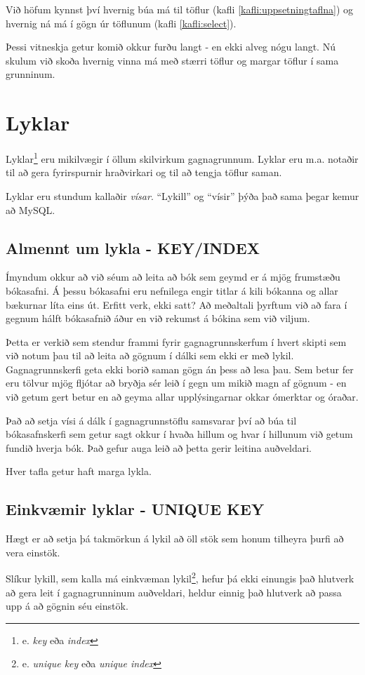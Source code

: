 Við höfum kynnst því hvernig búa má til töflur (kafli \ref{kafli:uppsetningtaflna}) og hvernig ná má í gögn úr töflunum (kafli \ref{kafli:select}). 

Þessi vitneskja getur komið okkur furðu langt - en ekki alveg nógu langt. Nú skulum við skoða hvernig vinna má með stærri töflur og margar töflur í sama grunninum.
\section{Lyklar}
\label{undirkafli:lyklar}
Lyklar\footnote{e. \emph{key} eða \emph{index}} eru mikilvægir í öllum skilvirkum gagnagrunnum. Lyklar eru m.a. notaðir til að gera fyrirspurnir hraðvirkari og til að tengja töflur saman.

Lyklar eru stundum kallaðir \emph{vísar}. ``Lykill'' og ``vísir'' þýða það sama þegar kemur að MySQL.
\subsection{Almennt um lykla - KEY/INDEX}
Ímyndum okkur að við séum að leita að bók sem geymd er á mjög frumstæðu bókasafni. Á þessu bókasafni eru nefnilega engir titlar á kili bókanna og allar bækurnar líta eins út.
Erfitt verk, ekki satt? Að meðaltali þyrftum við að fara í gegnum hálft bókasafnið áður en við rekumst á bókina sem við viljum.

Þetta er verkið sem stendur frammi fyrir gagnagrunnskerfum í hvert skipti sem við notum þau til að leita að gögnum í dálki sem ekki er með lykil.
Gagnagrunnskerfi geta ekki borið saman gögn án þess að lesa þau.
Sem betur fer eru tölvur mjög fljótar að bryðja sér leið í gegn um mikið magn af gögnum - en við getum gert betur en að geyma allar upplýsingarnar okkar ómerktar og óraðar.

Það að setja vísi á dálk í gagnagrunnstöflu samsvarar því að búa til bókasafnskerfi sem getur sagt okkur í hvaða hillum og hvar í hillunum við getum fundið hverja bók. Það gefur auga leið að þetta gerir leitina auðveldari.

Hver tafla getur haft marga lykla.
\subsection{Einkvæmir lyklar - UNIQUE KEY}
Hægt er að setja þá takmörkun á lykil að öll stök sem honum tilheyra þurfi að vera einstök.

Slíkur lykill, sem kalla má einkvæman lykil\footnote{e. \emph{unique key} eða \emph{unique index}}, hefur þá ekki einungis það hlutverk að gera leit í gagnagrunninum auðveldari, heldur einnig það hlutverk að passa upp á að gögnin séu einstök.

